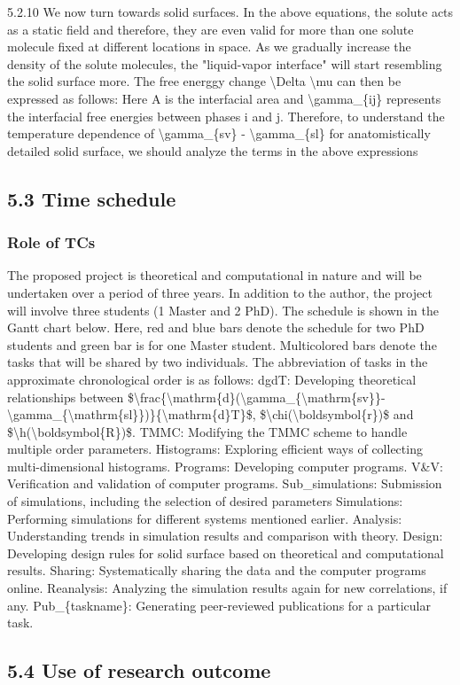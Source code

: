 \par 5.2.10  We now turn towards solid surfaces. In the above equations, the solute acts as a static field and therefore, they are even valid for more than one solute molecule fixed at different locations in space. As we gradually increase the density of the solute molecules, the "liquid-vapor interface" will start  resembling the solid surface more. The free energgy change \textbackslash Delta \textbackslash mu can then be expressed as follows: Here A is the interfacial area and \textbackslash gamma\_\{ij\} represents the interfacial free energies between phases i and j. Therefore, to understand the temperature dependence of \textbackslash gamma\_\{sv\} - \textbackslash gamma\_\{sl\} for anatomistically detailed solid surface, we should analyze the terms in the above expressions\subsection{5.3 Time schedule}
\subsubsection{Role of TCs}

\par The proposed project is theoretical and computational in nature and will be undertaken over a period of three years. In addition to the author, the project will involve three students (1 Master and 2 PhD). The schedule is shown in the Gantt chart below. Here, red and blue bars denote the schedule for two PhD students and green bar is for one Master student. Multicolored bars denote the tasks that will be shared by two individuals. The abbreviation of tasks in the approximate chronological order is as follows:
dgdT: Developing theoretical relationships between \$\textbackslash frac\{\textbackslash mathrm\{d\}(\textbackslash gamma\_\{\textbackslash mathrm\{sv\}\}-\textbackslash gamma\_\{\textbackslash mathrm\{sl\}\})\}\{\textbackslash mathrm\{d\}T\}\$, \$\textbackslash chi(\textbackslash boldsymbol\{r\})\$ and \$\textbackslash h(\textbackslash boldsymbol\{R\})\$.
TMMC: Modifying the TMMC scheme to handle multiple order parameters.
Histograms: Exploring efficient ways of collecting multi-dimensional histograms.
Programs: Developing computer programs.
V\&V: Verification and validation of computer programs.
Sub\_simulations: Submission of simulations, including the selection of desired parameters
Simulations: Performing simulations for different systems mentioned earlier.
Analysis: Understanding trends in simulation results and comparison with theory.
Design: Developing design rules for solid surface based on theoretical and computational results.
Sharing: Systematically sharing the data and the computer programs online.
Reanalysis: Analyzing the simulation results again for new correlations, if any.
Pub\_\{taskname\}: Generating peer-reviewed publications for a particular task.\subsection{5.4 Use of research outcome}
